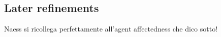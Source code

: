 


\subsection{Later refinements} 
Naess si ricollega perfettamente all'agent affectedness che dico sotto!


